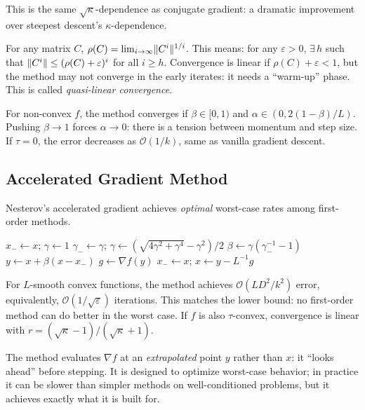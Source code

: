 This is the same $\sqrt{\kappa}$-dependence as conjugate gradient: a dramatic improvement over steepest descent's $\kappa$-dependence.

\begin{definition}\label{def:gelfand}
	For any matrix $C$, $\rho(C) = \lim_{i \to \infty} \lVert C^i\rVert^{1/i}$.
	This means: for any $\varepsilon > 0$, $\exists\, h$ such that $\lVert C^i\rVert \leq (\rho(C) + \varepsilon)^i$ for all $i \geq h$.
	Convergence is linear if $\rho(C) + \varepsilon < 1$, but the method may not converge in the early iterates: it needs a ``warm-up'' phase.
	This is called \emph{quasi-linear convergence}.
\end{definition}

For non-convex $f$, the method converges if $\beta \in [0, 1)$ and $\alpha \in (0, 2(1 - \beta)/L)$.
Pushing $\beta \to 1$ forces $\alpha \to 0$: there is a tension between momentum and step size.
If $\tau = 0$, the error decreases as $\mathcal{O}(1/k)$, same as vanilla gradient descent.


\subsection{Accelerated Gradient Method}\label{sec:accelerated}

Nesterov's accelerated gradient achieves \emph{optimal} worst-case rates among first-order methods.

\begin{algorithm}
	\caption{Accelerated Gradient (ACCG)}
	\begin{algorithmic}[1]
			\State $x_- \gets x$;\; $\gamma \gets 1$
			\Repeat
				\State $\gamma_- \gets \gamma$;\;
					$\gamma \gets (\sqrt{4\gamma^2 + \gamma^4} - \gamma^2) / 2$
				\State $\beta \gets \gamma(\gamma_-^{-1} - 1)$
				\State $y \gets x + \beta(x - x_-)$
				\State $g \gets \nabla f(y)$
				\State $x_- \gets x$;\; $x \gets y - L^{-1} g$
		\EndProcedure
	\end{algorithmic}
\end{algorithm}

For $L$-smooth convex functions, the method achieves $\mathcal{O}(LD^2/k^2)$ error, equivalently, $\mathcal{O}(1/\sqrt{\varepsilon})$ iterations.
This matches the lower bound: no first-order method can do better in the worst case.
If $f$ is also $\tau$-convex, convergence is linear with $r = (\sqrt{\kappa} - 1)/(\sqrt{\kappa} + 1)$.

The method evaluates $\nabla f$ at an \emph{extrapolated} point $y$ rather than $x$: it ``looks ahead'' before stepping.
It is designed to optimize worst-case behavior; in practice it can be slower than simpler methods on well-conditioned problems, but it achieves exactly what it is built for.